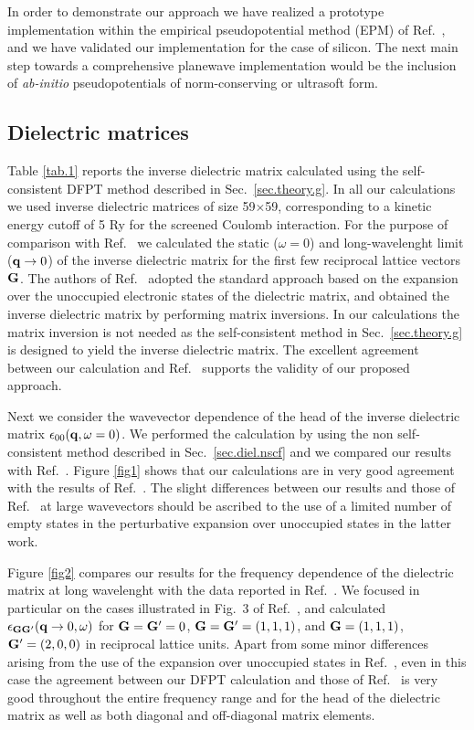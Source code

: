 \documentclass[twocolumn,prb,showpacs,superscriptaddress]{revtex4}
\def\w{\omega}
\def\q{{\bf q}}
\def\G{{\bf G}}
\def\Gp{{\bf G^\prime}}
\begin{document}
In order to demonstrate our approach we have realized a prototype implementation
within the empirical pseudopotential method (EPM) of Ref.\ ,
and we have validated our implementation for the case of silicon.
The next main step towards a comprehensive planewave implementation would be 
the inclusion of {\it ab-initio} pseudopotentials of norm-conserving\cite{ncpp} 
or ultrasoft\cite{uspp} form. 

\subsection{Dielectric matrices}

Table \ref{tab.1} reports the inverse dielectric matrix calculated using
the self-consistent DFPT method described in Sec.~\ref{sec.theory.g}.
In all our calculations we used inverse dielectric matrices of size 59$\times$59, 
corresponding to a kinetic energy cutoff of 5 Ry for the screened Coulomb interaction.
For the purpose of comparison with Ref.\  
we calculated the static ($\w=0$) and long-wavelenght limit ($\q \rightarrow 0$) of the inverse dielectric matrix
for the first few reciprocal lattice vectors $\G$. 
The authors of Ref.\  adopted the standard approach based 
on the expansion over the unoccupied electronic states of the dielectric matrix, 
and obtained the inverse dielectric matrix by performing matrix inversions.
In our calculations the matrix inversion is not needed as the self-consistent method 
in Sec.~\ref{sec.theory.g} is designed to yield the inverse dielectric matrix.
The excellent agreement between our calculation and Ref.~
supports the validity of our proposed approach.

Next we consider the wavevector dependence of the head of the
inverse dielectric matrix $\epsilon_{00}(\q,\w=0)$. We performed the
calculation by using the non self-consistent method described in
Sec.\ \ref{sec.diel.nscf} and we compared our results with Ref.\ .
Figure \ref{fig1} shows that our calculations are in very good agreement with the results
of Ref.\ . The slight differences between our results and those
of Ref.\  at large wavevectors should be ascribed to the use of a limited 
number of empty states in the perturbative expansion over unoccupied states in the latter work.

Figure \ref{fig2} compares our results for the frequency dependence of the dielectric matrix
at long wavelenght with the data reported in Ref.\ . 
We focused in particular on the cases illustrated in Fig.\ 3 of Ref.\ ,
and calculated $\epsilon_{\G\Gp}(\q\rightarrow 0,\w)$ for $\G=\Gp=0$, $\G=\Gp=(1,1,1)$,
and $\G=(1,1,1)$, $\Gp=(2,0,0)$ in reciprocal lattice units.
Apart from some minor differences arising from the use of the expansion over unoccupied
states in Ref.\ , even in this case the agreement between our DFPT calculation 
and those of Ref.\  is very good throughout the entire frequency range
and for the head of the dielectric matrix as well as both diagonal and off-diagonal matrix elements.
\end{document}
